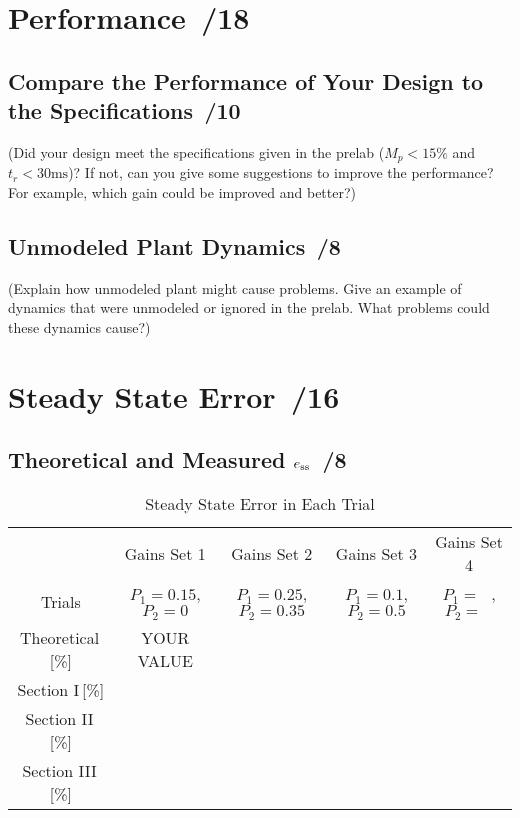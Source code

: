 \documentclass{article}
\newcommand{\score}{\hfill \underline{\hspace{0.65cm}}\,/} %
\begin{document}
\section{Performance \score 18}
\subsection{Compare the Performance of Your Design to the Specifications  \score 10}
(Did your design meet the specifications given in the prelab ($M_p < 15\%$ and $t_r < 30 \si{\milli\second}$)? If not, can you give some suggestions to improve the performance? For example, which gain could be improved and better?)
\subsection{Unmodeled Plant Dynamics \score 8}
(Explain how unmodeled plant might cause problems. Give an example of dynamics that were unmodeled or ignored in the prelab. What problems could these dynamics cause?)

\section{Steady State Error \score 16}
\subsection{Theoretical and Measured $e_{\rm ss}$ \score 8}
\begin{table}[phtb]\footnotesize 
\begin{center}
\caption{Steady State Error in Each Trial}
\label{tbl:lab5_q3}
\begin{tabular}{c|m{1.2cm}|m{1.2cm}|m{1.2cm}|m{1.2cm}|m{1.2cm}|m{1.2cm}|m{1.2cm}|m{1.2cm}} \hline \hline
\cellcolor{lightgray} & \multicolumn{2}{c|}{\cellcolor{lightgray}Gains Set 1} & \multicolumn{2}{c|}{\cellcolor{lightgray}Gains Set 2} & \multicolumn{2}{c|}{\cellcolor{lightgray}Gains Set 3} & \multicolumn{2}{c}{\cellcolor{lightgray}Gains Set 4}\\ \cline{2-9}
\multirow{-2}{*}{\cellcolor{lightgray}Trials}& \multicolumn{2}{c|}{$P_1 = 0.15$, $P_2 = 0$}& \multicolumn{2}{c|}{$P_1 = 0.25$, $P_2 = 0.35$}& \multicolumn{2}{c|}{$P_1 = 0.1$, $P_2 = 0.5$}& \multicolumn{2}{c}{$P_1 = ~~~$, $P_2 = ~~~$}\\ \hline
Theoretical\,[\%] & \multicolumn{2}{c|}{YOUR VALUE} & \multicolumn{2}{c|}{~} & \multicolumn{2}{c|}{~} & \multicolumn{2}{c}{~} \\ \hline
Section I\,[\%] & \multicolumn{2}{c|}{} & \multicolumn{2}{c|}{} & \multicolumn{2}{c|}{} & \multicolumn{2}{c}{} \\ \hline
Section II\,[\%]& \multicolumn{2}{c|}{} & \multicolumn{2}{c|}{} & \multicolumn{2}{c|}{} & \multicolumn{2}{c}{} \\ \hline
Section III\,[\%] & \multicolumn{2}{c|}{} & \multicolumn{2}{c|}{} & \multicolumn{2}{c|}{} & \multicolumn{2}{c}{} \\ \hline
\end{tabular}
\end{center}
\end{table}
\end{document}
